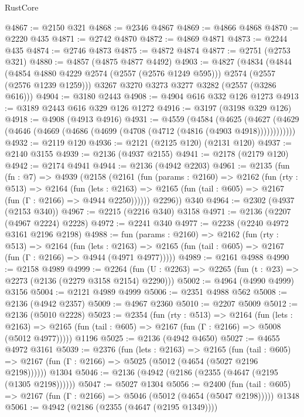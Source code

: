 \begin{lexlean}{RustCore}
\begin{coremodule}
@4867 := @2150 @321
@4868 := @2346 @4867
@4869 := @4866 @4868
@4870 := @2220 @435
@4871 := @2742 @4870
@4872 := @4869 @4871
@4873 := @2244 @435
@4874 := @2746 @4873
@4875 := @4872 @4874
@4877 := @2751 (@2753 @321)
@4880 := @4857 (@4875 @4877 @4492)
@4903 := @4827
    (@4834
      (@4844 (@4854 @4880 @4229 @2574 (@2557 (@2576 @1249 @595))) @2574 (@2557 (@2576 @1239 @1259)))
      @3267
      @3270
      @3273
      @3277
      @3282
      (@2557 (@3286 @616)))
@4904 := @3180 @2443
@4908 := @4904 @616 @332 @126 @1273
@4913 := @3189 @2443 @616 @329 @126 @1272
@4916 := @3197 (@3198 @329 @126)
@4918 := @4908 (@4913 @4916)
@4931 := @4559
    (@4584
      (@4625 (@4627 (@4629 (@4646 (@4669 (@4686 (@4699 (@4708 (@4712 (@4816 (@4903 @4918))))))))))))
@4932 := @2119 @120
@4936 := @2121 (@2125 @120) (@2131 @120)
@4937 := @2140 @3155
@4939 := @2136 (@4937 @2155)
@4941 := @2178 (@2179 @120)
@4942 := @2174 @4941
@4944 := @2136 (@4942 @2203)
@4961 := @2135
    (fun (fn : @7) =>
    @4939
      (@2158
        (@2161
          (fun (params : @2160) =>
          @2162
            (fun (rty : @513) =>
            @2164
              (fun (lets : @2163) =>
              @2165 (fun (tail : @605) => @2167 (fun (Γ : @2166) => @4944 @2250))))))
        @2296))
    @340
@4964 := @2302 (@4937 (@2153 @340))
@4967 := @2215 (@2216 @340) @3158
@4971 := @2136 (@2207 (@4967 @2224) @2228)
@4972 := @2241 @340
@4977 := @2238 (@2240 @4972 @3161 @2196 @2198)
@4988 := fun (params : @2160) =>
  @2162
    (fun (rty : @513) =>
    @2164
      (fun (lets : @2163) =>
      @2165 (fun (tail : @605) => @2167 (fun (Γ : @2166) => @4944 (@4971 @4977)))))
@4989 := @2161 @4988
@4990 := @2158 @4989
@4999 := @2264 (fun (U : @2263) => @2265 (fun (t : @23) => @2273 (@2136 (@2279 @3158 @2154) @2290)))
@5002 := @4964 (@4990 @4999) @3156
@5004 := @2121 @4989 @4999
@5006 := @2351 @4988 @562
@5008 := @2136 (@4942 @2357)
@5009 := @4967 @2360
@5010 := @2207 @5009
@5012 := @2136 (@5010 @2228)
@5023 := @2354
    (fun (rty : @513) =>
    @2164
      (fun (lets : @2163) =>
      @2165 (fun (tail : @605) => @2167 (fun (Γ : @2166) => @5008 (@5012 @4977)))))
    @1196
@5025 := @2136 (@4942 @4650)
@5027 := @4655 @4972 @3161
@5039 := @2376
    (fun (lets : @2163) =>
    @2165
      (fun (tail : @605) => @2167 (fun (Γ : @2166) => @5025 (@5012 (@4654 (@5027 @2196 @2198))))))
    @1304
@5046 := @2136 (@4942 (@2186 (@2355 (@4647 (@2195 (@1305 @2198))))))
@5047 := @5027 @1304
@5056 := @2400
    (fun (tail : @605) => @2167 (fun (Γ : @2166) => @5046 (@5012 (@4654 (@5047 @2198)))))
    @1348
@5061 := @4942 (@2186 (@2355 (@4647 (@2195 @1349))))

\end{coremodule}
\end{lexlean}
